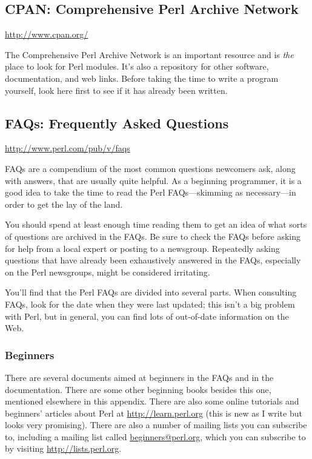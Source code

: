 \subsection{CPAN: Comprehensive Perl Archive Network}
\href{http://www.cpan.org/}{http://www.cpan.org/}

\begin{adjustwidth}{1cm}{}
The Comprehensive Perl Archive Network is an important resource and is \textit{the} place to look for Perl modules. It's also a repository for other software, documentation, and web links. Before taking the time to write a program yourself, look here first to see if it has already been written.
\end{adjustwidth}

\subsection{FAQs: Frequently Asked Questions}
\href{http://www.perl.com/pub/v/faqs}{http://www.perl.com/pub/v/faqs}

\begin{adjustwidth}{1cm}{}
FAQs are a compendium of the most common questions newcomers ask, along with answers, that are usually quite helpful. As a beginning programmer, it is a good idea to take the time to read the Perl FAQs—skimming as necessary—in order to get the lay of the land.
\end{adjustwidth}

You should spend at least enough time reading them to get an idea of what sorts of questions are archived in the FAQs. Be sure to check the FAQs before asking for help from a local expert or posting to a newsgroup. Repeatedly asking questions that have already been exhaustively answered in the FAQs, especially on the Perl newsgroups, might be considered irritating.

You'll find that the Perl FAQs are divided into several parts. When consulting FAQs, look for the date when they were last updated; this isn't a big problem with Perl, but in general, you can find lots of out-of-date information on the Web.

\subsubsection{Beginners}
There are several documents aimed at beginners in the FAQs and in the documentation. There are some other beginning books besides this one, mentioned elsewhere in this appendix. There are also some online tutorials and beginners' articles about Perl at \href{http://learn.perl.org}{http://learn.perl.org} (this is new as I write but looks very promising). There are also a number of mailing lists you can subscribe to, including a mailing list called \href{mailto:beginners@perl.org}{beginners@perl.org}, which you can subscribe to by visiting \href{http://lists.perl.org}{http://lists.perl.org}.

